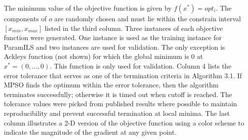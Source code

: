 The minimum value of the objective function is given by $f(x^*) = opt_{i}$. The components of $o$ are randomly chosen and must lie within the constrain interval $[x_{min}, x_{max}]$ listed in the third column. Three instances of each objective function were generated. One instance is used as the training instance for ParamILS and two instances are used for validation. The only exception is Ackley{\vtick}s function (not shown) for which the global minimum is $0$ at $x^* = (0,...,0)$. This function is only used for validation. Column 4 lists the error tolerance that serves as one of the termination criteria in Algorithm 3.1. If MPSO finds the optimum within the error tolerance, then the algorithm terminates successfully; otherwise it is timed out when cutoff is reached. The tolerance values were picked from published results where possible to maintain reproducibility and prevent successful termination at local minima. The last column illustrates a 2-D version of the objective function using a color scheme to indicate the magnitude of the gradient at any given point.\\

